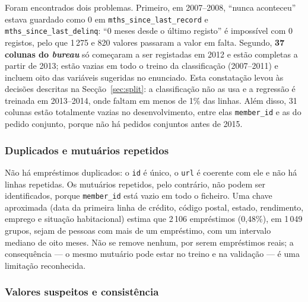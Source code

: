 Foram encontrados dois problemas. Primeiro, em 2007--2008, ``nunca aconteceu'' estava
guardado como 0 em \texttt{mths\_since\_last\_record} e \texttt{mths\_since\_last\_delinq}:
``0 meses desde o último registo'' é impossível com 0 registos, pelo que 1\,275 e 820
valores passaram a valor em falta. Segundo, \textbf{37 colunas do \textit{bureau}} só
começaram a ser registadas em 2012 e estão completas a partir de 2013; estão vazias em todo
o treino da classificação (2007--2011) e incluem oito das variáveis sugeridas no enunciado.
Esta constatação levou às decisões descritas na Secção~\ref{sec:split}: a classificação não
as usa e a regressão é treinada em 2013--2014, onde faltam em menos de 1\% das linhas.
Além disso, 31 colunas estão totalmente vazias no desenvolvimento, entre elas
\texttt{member\_id} e as do pedido conjunto, porque não há pedidos conjuntos antes de 2015.

\subsubsection{Duplicados e mutuários repetidos}

Não há empréstimos duplicados: o \texttt{id} é único, o \texttt{url} é coerente com ele e
não há linhas repetidas. Os mutuários repetidos, pelo contrário, não podem ser
identificados, porque \texttt{member\_id} está vazio em todo o ficheiro. Uma chave
aproximada (data da primeira linha de crédito, código postal, estado, rendimento, emprego e
situação habitacional) estima que 2\,106 empréstimos (0,48\%), em 1\,049 grupos, sejam de
pessoas com mais de um empréstimo, com um intervalo mediano de oito meses. Não se remove
nenhum, por serem empréstimos reais; a consequência --- o mesmo mutuário pode estar no
treino e na validação --- é uma limitação reconhecida.

\subsubsection{Valores suspeitos e consistência}

